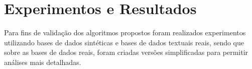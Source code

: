 \documentclass[
    12pt,                %
    oneside,            %
    a4paper,            %
    english,            %
    brazil                %
    ]{abntex2ppgsi}
\begin{document}







\chapter{Experimentos e Resultados}
\label{ch:experiments}


Para fins de validação dos algoritmos propostos foram realizados experimentos utilizando bases de dados sintéticas e bases de dados textuais reais, sendo que sobre as bases de dados reais, foram criadas versões simplificadas para permitir análises mais detalhadas. 
\end{document}

